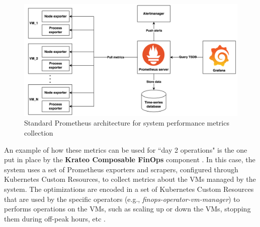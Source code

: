 \begin{figure}[t]
  \centering
  \includegraphics[width=1\linewidth]{images/prometheus.png}
  \caption{Standard Prometheus architecture for system performance metrics collection}
  \label{fig:prometheus}
\end{figure}

An example of how these metrics can be used for ``day 2 operations" is the one put in place by the \textbf{Krateo Composable FinOps} component \cite{krateo_docs}.
In this case, the system uses a set of Prometheus exporters and scrapers, configured through Kubernetes Custom Resources, to collect metrics about the VMs managed by the system.
The optimizations are encoded in a set of Kubernetes Custom Resources that are used by the specific operators (e.g., \textit{finops-operator-vm-manager}) to performs operations on the VMs, such as scaling up or down the VMs, stopping them during off-peak hours, etc \cite{krateo_docs}.
\newline

